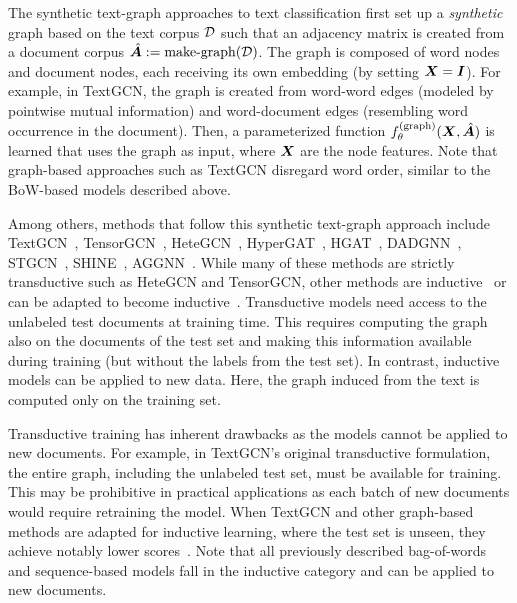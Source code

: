\documentclass[acmsmall,nonacm]{acmart}
\begin{document}
The synthetic text-graph approaches to text classification first set up a \emph{synthetic} graph based on the text corpus $\mathcal{D}$ such that an adjacency matrix is created from a document corpus $\hat{{\bm{A}}} := \operatorname{make-graph}(\mathcal{D})$.
The graph is composed of word nodes and document nodes, each receiving its own embedding (by setting ${\bm{X}} ={\bm{I}}$).
For example, in TextGCN, the graph is created from word-word edges (modeled by pointwise mutual information) and word-document edges (resembling word occurrence in the document).
Then, a parameterized function $f_\theta^{(\mathrm{graph})}({\bm{X}}, \hat{{\bm{A}}})$ is learned that uses the graph as input, where ${\bm{X}}$ are the node features. 
Note that graph-based approaches such as TextGCN disregard word order, similar to the BoW-based models described above.

Among others, methods that follow this synthetic text-graph approach include
TextGCN~\cite{DBLP:conf/aaai/YaoM019},
TensorGCN~\cite{DBLP:conf/aaai/LiuYZWL20},
Hete\-GCN~\cite{DBLP:conf/wsdm/RageshSIBL21},
HyperGAT~\cite{DBLP:conf/emnlp/DingWLLL20}, 
HGAT~\cite{DBLP:journals/tois/YangHSJLN21},
DADGNN~\cite{DBLP:conf/aaai/LiuYZWL20}, 
STGCN~\cite{stgcn},
SHINE~\cite{DBLP:conf/emnlp/WangWYD21},
AGGNN~\cite{aggnn}.
While many of these methods are strictly transductive such as HeteGCN and TensorGCN, other methods are 
inductive~\cite{DBLP:conf/coling/HuangCC22,induct-gcn,texting_acl2020,DBLP:conf/emnlp/HuangMLZW19} or can be adapted to become inductive~\cite{DBLP:conf/wsdm/RageshSIBL21}.
Transductive models need access to the unlabeled test documents at training time. 
This requires computing the graph also on the documents of the test set and making this information available during training (but without the labels from the test set).
In contrast, inductive models can be applied to new data. 
Here, the graph induced from the text is computed only on the training set.

Transductive training has inherent drawbacks as the models cannot be applied to new documents.
For example, in TextGCN's original transductive formulation, the entire graph, including the unlabeled test set, must be available for training.
This may be prohibitive in practical applications as each batch of new documents would require retraining the model.
When TextGCN and other graph-based methods are adapted for inductive learning, where the test set is unseen, they achieve notably lower scores~\cite{DBLP:conf/wsdm/RageshSIBL21}. 
Note that all previously described bag-of-words and sequence-based models fall in the inductive category and can be applied to new documents.
\end{document}

